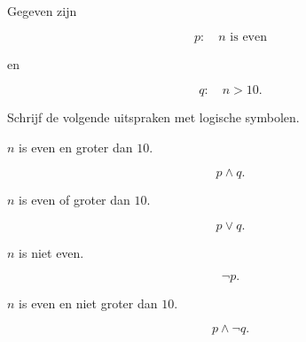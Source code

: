 \documentclass{ximera}
\begin{document}
\begin{oefening}{\oefB \ESS}

Gegeven zijn

\[
p:\quad n\text{ is even}
\]

en

\[
q:\quad n>10.
\]

Schrijf de volgende uitspraken met logische symbolen.

\begin{question}

$n$ is even en groter dan $10$.

\begin{oplossing}

\[
p\land q.
\]

\end{oplossing}

\end{question}



\begin{question}

$n$ is even of groter dan $10$.

\begin{oplossing}

\[
p\lor q.
\]

\end{oplossing}

\end{question}



\begin{question}

$n$ is niet even.

\begin{oplossing}

\[
\neg p.
\]

\end{oplossing}

\end{question}



\begin{question}

$n$ is even en niet groter dan $10$.

\begin{oplossing}

\[
p\land\neg q.
\]

\end{oplossing}

\end{question}

\end{oefening}
\end{document}

